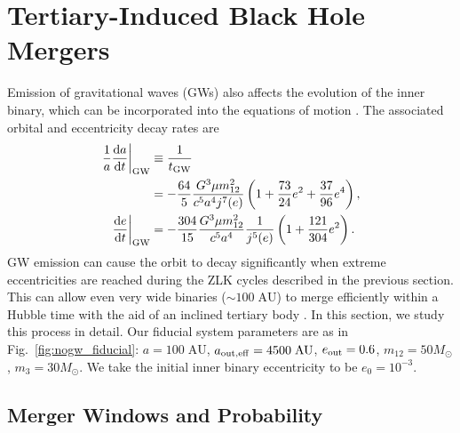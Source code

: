 \documentclass[
        fleqn,
        usenatbib,
    ]{mnras}
\newcommand*{\rd}[2]{\frac{\mathrm{d}#1}{\mathrm{d}#2}}
\newcommand*{\at}[1]{\left.#1\right|}
\newcommand*{\p}[1]{\left(#1\right)}
\begin{document}
\section{Tertiary-Induced Black Hole Mergers}\label{s:with_gw}

Emission of gravitational waves (GWs) also affects the evolution of the inner
binary, which can be incorporated into the equations of motion
\citep{peters1964, LL18}. The associated orbital and eccentricity decay rates
are
\begin{align}
    \at{\frac{1}{a}\rd{a}{t}}_{\rm GW} &\equiv \frac{1}{t_{\rm GW}}\nonumber\\
        &= -\frac{64}{5}\frac{G^3 \mu m_{12}^2}{c^5a^4j^7(e)}
            \p{1 + \frac{73}{24}e^2 + \frac{37}{96}e^4}\label{eq:def_tgw},\\
    \at{\rd{e}{t}}_{\rm GW} &= -\frac{304}{15}\frac{G^3 \mu m_{12}^2}{c^5a^4}
        \frac{1}{j^{5}(e)}\p{1 + \frac{121}{304}e^2}\label{eq:dedt_gw}.
\end{align}
GW emission can cause the orbit to decay significantly when extreme
eccentricities are reached during the ZLK cycles described in the previous
section. This can allow even very wide binaries ($\sim 100\;\mathrm{AU}$) to
merge efficiently within a Hubble time with the aid of an inclined tertiary body
\citep{LL18, LL19}. In this section, we study this process in detail. Our
fiducial system parameters are as in Fig.~\ref{fig:nogw_fiducial}: $a =
100\;\mathrm{AU}$, $a_{\rm out, eff} = 4500\;\mathrm{AU}$, $e_{\rm out} = 0.6$,
$m_{12} = 50M_{\odot}$, $m_3 = 30M_{\odot}$. We take the initial inner binary
eccentricity to be $e_0 = 10^{-3}$.

\subsection{Merger Windows and Probability}\label{ss:windows}
\end{document}
